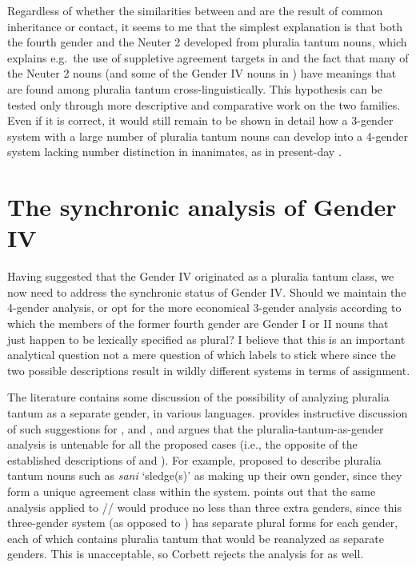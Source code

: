 \documentclass[output=collectionpaper]{langsci/langscibook}
\begin{document}
Regardless of whether the similarities between  and  are the result of common inheritance or contact, it seems to me that the simplest explanation is that both the  fourth gender and the  Neuter 2 developed from pluralia tantum nouns, which explains e.g.\ the use of suppletive agreement targets in  and the fact that many of the  Neuter 2 nouns (and some of the Gender IV nouns in ) have meanings that are found among pluralia tantum cross-linguistically. This hypothesis can be tested only through more descriptive and comparative work on the two families.
Even if it is correct, it would still remain to be shown in detail how a 3-gender system with a large number of pluralia tantum nouns can develop into a 4-gender system lacking number distinction in inanimates, as in present-day .


\section{The synchronic analysis of Gender IV}
\label{sec:Bruno:Mar-synchrony}

Having suggested that the  Gender IV originated as a pluralia tantum class, we now need to address the synchronic status of Gender IV. Should we maintain the 4-gender analysis, or opt for the more economical 3-gender analysis according to which the members of the former fourth gender are Gender I or II nouns that just happen to be lexically specified as plural? I believe that this is an important analytical question \textendash{} not a mere question of which labels to stick where \textendash{} since the two possible descriptions result in wildly different systems in terms of assignment.

The literature contains some discussion of the possibility of analyzing pluralia tantum as a separate gender, in various languages. \cite[233--239]{Corbett2012} provides instructive discussion of such suggestions for ,  and , and argues that the pluralia-tantum-as-gender analysis is untenable for all the proposed cases (i.e., the opposite of the established descriptions of  and ). For example, \cite{Zaliznjak1964} proposed to describe  pluralia tantum nouns such as \emph{sani} `sledge(s)' as making up their own gender, since they form a unique agreement class within the system. \cite[237--238]{Corbett2012} points out that the same analysis applied to // would produce no less than three extra genders, since this three-gender system (as opposed to ) has separate plural forms for each gender, each of which contains pluralia tantum that would be reanalyzed as separate genders. This is unacceptable, so Corbett rejects the analysis for  as well.
\end{document}
